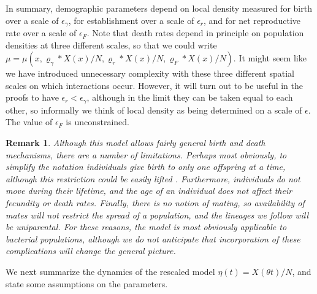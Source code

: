 \documentclass[12pt]{article}
\newtheorem{remark}[theorem]{Remark}
\newcommand{\kernel}{\varrho}  %
\newcommand{\smooth}[1]{\kernel_{#1} \! * \!}  %
\begin{document}
In summary, demographic parameters depend on local density measured
for birth over a scale of $\epsilon_\gamma$,
for establishment over a scale of $\epsilon_r$,
and for net reproductive rate over a scale of $\epsilon_F$.
Note that death rates depend in principle on population densities at three different scales,
so that we could write $\mu = \mu(x, \smooth{\gamma} X(x) / N, \smooth{r} X(x) / N, \smooth{F} X(x) / N)$.
It might seem like
we have introduced unnecessary complexity
with these three different spatial scales on which interactions occur.
However,
it will turn out to be useful in the proofs to have $\epsilon_r < \epsilon_\gamma$,
although in the limit they can be taken equal to each other,
so informally we think of local density as being determined on a scale of $\epsilon$.
The value of $\epsilon_F$ is unconstrained.

\begin{remark}
Although this model allows fairly general birth and death mechanisms,
there are a number of limitations.
Perhaps most obviously, to simplify the notation
individuals give birth to only one offspring at a time,
although this restriction could be easily lifted
\citep[as in][]{etheridge/kurtz:2018}.
Furthermore, individuals do not move during their lifetime,
and the age of an individual does not affect their fecundity or death rates.
Finally, there is no notion of mating,
so availability of mates will not restrict the spread of a population,
and the lineages we follow will be uniparental.
For these reasons, the model is most obviously applicable to bacterial populations,
although we do not anticipate that incorporation of these complications
will change the general picture.
\end{remark}

We next summarize the dynamics of the rescaled model $\eta(t) = X(\theta t)/N$,
and state some assumptions on the parameters.
\end{document}
